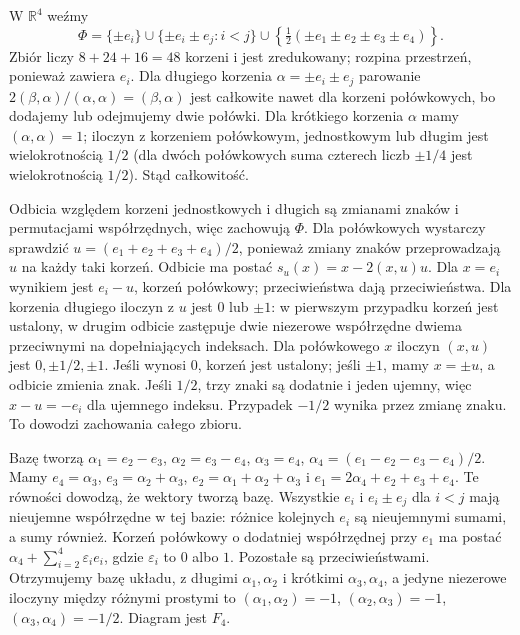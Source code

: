 \begin{przyklad}[Model $F_4$]
\label{aa:prz:f4-roots}
W $\mathbb R^4$ weźmy
\[
 \Phi=\{\pm e_i\}\cup\{\pm e_i\pm e_j:i<j\}
       \cup\left\{\tfrac12(\pm e_1\pm e_2\pm e_3\pm e_4)\right\}.
\]
Zbiór liczy $8+24+16=48$ korzeni i jest zredukowany;
rozpina przestrzeń, ponieważ zawiera $e_i$.
Dla długiego korzenia $\alpha=\pm e_i\pm e_j$
parowanie $2(\beta,\alpha)/(\alpha,\alpha)=(\beta,\alpha)$
jest całkowite nawet dla korzeni połówkowych,
bo dodajemy lub odejmujemy dwie połówki.
Dla krótkiego korzenia $\alpha$ mamy
$(\alpha,\alpha)=1$; iloczyn z korzeniem
połówkowym, jednostkowym lub długim jest
wielokrotnością $1/2$ (dla dwóch połówkowych
suma czterech liczb $\pm1/4$ jest wielokrotnością
$1/2$). Stąd całkowitość.

Odbicia względem korzeni jednostkowych i długich
są zmianami znaków i permutacjami współrzędnych,
więc zachowują $\Phi$. Dla połówkowych wystarczy
sprawdzić $u=(e_1+e_2+e_3+e_4)/2$, ponieważ
zmiany znaków przeprowadzają $u$ na każdy taki
korzeń. Odbicie ma postać $s_u(x)=x-2(x,u)u$.
Dla $x=e_i$ wynikiem jest $e_i-u$, korzeń
połówkowy; przeciwieństwa dają przeciwieństwa.
Dla korzenia długiego iloczyn z $u$ jest $0$ lub
$\pm1$: w pierwszym przypadku korzeń jest ustalony,
w drugim odbicie zastępuje dwie niezerowe współrzędne
dwiema przeciwnymi na dopełniających indeksach.
Dla połówkowego $x$ iloczyn $(x,u)$ jest
$0,\pm1/2,\pm1$. Jeśli wynosi $0$, korzeń jest
ustalony; jeśli $\pm1$, mamy $x=\pm u$, a odbicie
zmienia znak. Jeśli $1/2$, trzy znaki są dodatnie
i jeden ujemny, więc $x-u=-e_i$ dla ujemnego
indeksu. Przypadek $-1/2$ wynika przez zmianę znaku.
To dowodzi zachowania całego zbioru.

Bazę tworzą
$\alpha_1=e_2-e_3$, $\alpha_2=e_3-e_4$,
$\alpha_3=e_4$, $\alpha_4=(e_1-e_2-e_3-e_4)/2$.
Mamy $e_4=\alpha_3$, $e_3=\alpha_2+\alpha_3$,
$e_2=\alpha_1+\alpha_2+\alpha_3$ i
$e_1=2\alpha_4+e_2+e_3+e_4$.
Te równości dowodzą, że wektory tworzą bazę.
Wszystkie $e_i$ i $e_i\pm e_j$ dla $i<j$
mają nieujemne współrzędne w tej bazie:
różnice kolejnych $e_i$ są nieujemnymi sumami,
a sumy również. Korzeń połówkowy o dodatniej
współrzędnej przy $e_1$ ma postać
$\alpha_4+\sum_{i=2}^4\varepsilon_i e_i$,
gdzie $\varepsilon_i$ to $0$ albo $1$.
Pozostałe są przeciwieństwami. Otrzymujemy bazę
układu, z długimi $\alpha_1,\alpha_2$ i krótkimi
$\alpha_3,\alpha_4$, a jedyne niezerowe iloczyny
między różnymi prostymi to
$(\alpha_1,\alpha_2)=-1$, $(\alpha_2,\alpha_3)=-1$,
$(\alpha_3,\alpha_4)=-1/2$. Diagram jest $F_4$.
\end{przyklad}

